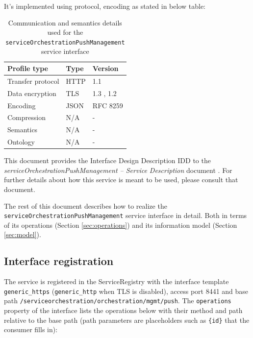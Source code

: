 \documentclass[a4paper]{arrowhead}
\begin{document}
It's implemented using protocol, encoding as stated in below table:
\begin{table}[ht!]
  \centering
  \begin{tabular}{|l|l|l|}
    \hline
    \rowcolor{gray!33} Profile type & Type & Version \\ \hline
    Transfer protocol & HTTP & 1.1 \cite{rfc9112} \\ \hline
    Data encryption & TLS & 1.3 \cite{rfc8446}, 1.2 \cite{rfc5246} \\ \hline
    Encoding & JSON & RFC 8259 \cite{rfc8259} \\ \hline
    Compression & N/A & - \\ \hline
    Semantics & N/A & - \\ \hline
    Ontology & N/A & - \\ \hline
  \end{tabular}
  \caption{Communication and semantics details used for the \texttt{service\allowbreak{}Orchestration\allowbreak{}Push\allowbreak{}Management} service interface}
  \label{tab:comunication_semantics_profile}
\end{table}

This document provides the Interface Design Description IDD to the \textit{serviceOrchestrationPushManagement -- Service Description} document \cite{dso-serviceOrchestrationPushManagement-sd}.
For further details about how this service is meant to be used, please consult that document.

The rest of this document describes how to realize the \texttt{service\allowbreak{}Orchestration\allowbreak{}Push\allowbreak{}Management} service
interface in detail. Both in terms of its operations (Section \ref{sec:operations}) and its information model (Section \ref{sec:model}).

\subsection{Interface registration}

The service is registered in the ServiceRegistry with the interface template \texttt{generic\_\allowbreak{}https} (\texttt{generic\_\allowbreak{}http} when TLS is disabled), access port 8441 and base path \texttt{/\allowbreak{}serviceorchestration/\allowbreak{}orchestration/\allowbreak{}mgmt/\allowbreak{}push}. The \texttt{operations} property of the interface lists the operations below with their method and path relative to the base path (path parameters are placeholders such as \texttt{\{id\}} that the consumer fills in):
\end{document}
